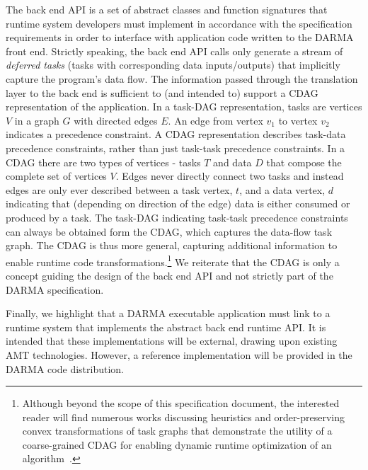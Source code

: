 The \gls{back end} \gls{API} is a set of abstract classes and function
signatures that \gls{runtime system} developers must implement in accordance with the
specification requirements in order to interface with application code written
to the \gls{DARMA} front end. 
Strictly speaking, the \gls{back end} \gls{API} calls only generate a stream of
\emph{deferred tasks} (tasks with corresponding data inputs/outputs) that
implicitly capture the program's data flow.
The information passed through the \gls{translation layer} to
the \gls{back end} is sufficient
to (and intended to) support a \gls{CDAG} representation of the application.
In a \gls{task-DAG} representation, tasks are vertices $V$ in a graph $G$ with directed edges $E$.
An edge from vertex $v_1$ to vertex $v_2$ indicates a precedence constraint.
A \gls{CDAG} representation describes task-data precedence constraints, rather
than just task-task precedence constraints.  In a \gls{CDAG} there are two
types of vertices - tasks $T$ and data $D$ that compose the complete set of vertices $V$.
Edges never directly connect two tasks and instead edges are only ever described between a task vertex, $t$, and a data vertex, $d$
indicating that (depending on direction of the edge) data is either consumed or produced by a task.
The \gls{task-DAG} indicating task-task precedence constraints can always be
obtained form the \gls{CDAG}, which captures the data-flow task graph.
The \gls{CDAG} is thus more general, capturing additional information to
enable runtime code transformations.\footnote{
Although beyond the scope of this specification document, the interested reader
will find numerous works discussing heuristics and order-preserving convex
transformations of task graphs that demonstrate the utility of a coarse-grained
\gls{CDAG} for enabling dynamic runtime optimization of an
algorithm~\cite{missingCitations}.}
We reiterate that the \gls{CDAG} is only a concept guiding the design
of the \gls{back end} \gls{API} and not strictly part of the \gls{DARMA}
specification.


Finally, we highlight that a \gls{DARMA} executable application must link to a \gls{runtime
  system} that implements the abstract \gls{back end} runtime \gls{API}.
It is intended that these implementations will be external, drawing upon
existing AMT technologies.  However,  a reference implementation will be provided
in the \gls{DARMA} code distribution.


